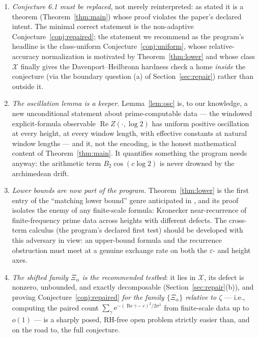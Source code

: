 \documentclass[11pt]{amsart}
\theoremstyle{definition}
\theoremstyle{remark}
\newcommand{\eE}{\mathrm{e}}
\DeclareMathOperator{\Rre}{Re}
\begin{document}
\begin{enumerate}
\item \emph{Conjecture 6.1 must be replaced}, not merely reinterpreted: as stated it is a theorem (Theorem~\ref{thm:main}) whose proof violates the paper's declared intent. The minimal correct statement is the non-adaptive Conjecture~\ref{conj:repaired}; the statement we recommend as the program's headline is the class-uniform Conjecture~\ref{conj:uniform}, whose relative-accuracy normalization is motivated by Theorem~\ref{thm:lower} and whose class $\mathcal X$ finally gives the Davenport--Heilbronn hardness check a home \emph{inside} the conjecture (via the boundary question (a) of Section~\ref{sec:repair}) rather than outside it.
\item \emph{The oscillation lemma is a keeper.} Lemma~\ref{lem:osc} is, to our knowledge, a new unconditional statement about prime-computable data --- the windowed explicit-formula observable $\Rre Z(\cdot,\log2)$ has uniform positive oscillation at every height, at every window length, with effective constants at natural window lengths --- and it, not the encoding, is the honest mathematical content of Theorem~\ref{thm:main}. It quantifies something the program needs anyway: the arithmetic term $B_2\cos(c\log2)$ is never drowned by the archimedean drift.
\item \emph{Lower bounds are now part of the program.} Theorem~\ref{thm:lower} is the first entry of the ``matching lower bound'' genre anticipated in \cite[\S6]{SI}, and its proof isolates the enemy of any finite-scale formula: Kronecker near-recurrence of finite-frequency prime data across heights with different defects. The cross-term calculus (the program's declared first test) should be developed with this adversary in view: an upper-bound formula and the recurrence obstruction must meet at a genuine exchange rate on both the $\varepsilon$- and height axes.
\item \emph{The shifted family $\Xi_\alpha$ is the recommended testbed}: it lies in $\mathcal X$, its defect is nonzero, unbounded, and exactly decomposable (Section~\ref{sec:repair}(b)), and proving Conjecture~\ref{conj:repaired} \emph{for the family $\{\Xi_\alpha\}$ relative to $\zeta$} --- i.e., computing the paired count $\sum_\gamma\eE^{-(\Rre\gamma-c)^2/2\sigma^2}$ from finite-scale data up to $o(1)$ --- is a sharply posed, RH-free open problem strictly easier than, and on the road to, the full conjecture.
\end{enumerate}
\end{document}
